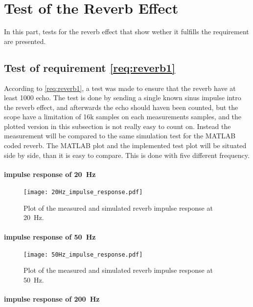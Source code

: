 \newpage
\section{Test of the Reverb Effect}
In this part, tests for the reverb effect that show wether it fulfills the requirement are presented. 


\subsection{Test of requirement \autoref{req:reverb1}}
According to \autoref{req:reverb1}, a test was made to ensure that the \gls{reverb} have at least 1000 echo. The test is done by sending a single known sinus impulse intro the \gls{reverb} effect, and afterwards the echo should haven been counted, but the scope have a limitation of 16k samples on each measurements samples, and the plotted version in this subsection is not really easy to count on. Instead the measurement will be compared to the same simulation test for the MATLAB coded \gls{reverb}. The MATLAB plot and the implemented test plot will be situated side by side, than it is easy to compare. This is done with five different frequency. 

\paragraph{impulse response of \SI{20}{\hertz}}

\begin{figure}[htbp!]
    \centering
        \texttt{[image: 20Hz\_impulse\_response.pdf]}
        \caption{Plot of the measured and simulated \gls{reverb} impulse response at \SI{20}{\hertz}.}
        \label{fig:tests:reverb:20Hz}
  \end{figure}
  
\paragraph{impulse response of \SI{50}{\hertz}}

\begin{figure}[htbp!]
    \centering
        \texttt{[image: 50Hz\_impulse\_response.pdf]}
        \caption{Plot of the measured and simulated \gls{reverb} impulse response at \SI{50}{\hertz}.}
        \label{fig:tests:reverb:50Hz}
  \end{figure}

\paragraph{impulse response of \SI{200}{\hertz}}

